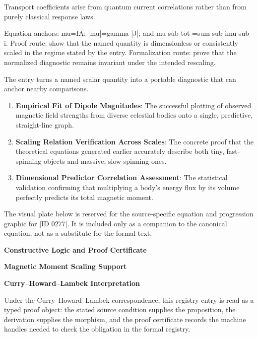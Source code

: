 Transport coefficients arise from quantum current correlations rather than from purely classical response laws.

Equation anchors: mu=IA; |mu|=gamma |J|; and mu sub tot =sum sub imu sub i. Proof route: show that the named quantity is dimensionless or consistently scaled in the regime stated by the entry. Formalization route: prove that the normalized diagnostic remains invariant under the intended rescaling.

The entry turns a named scalar quantity into a portable diagnostic that can anchor nearby comparisons.
\endgroup

\begin{enumerate}[leftmargin=1.6em,itemsep=6pt,topsep=4pt]
\item \textbf{Empirical Fit of Dipole Magnitudes}: The successful plotting of observed magnetic field strengths from diverse celestial bodies onto a single, predictive, straight-line graph.
\item \textbf{Scaling Relation Verification Across Scales}: The concrete proof that the theoretical equations generated earlier accurately describe both tiny, fast-spinning objects and massive, slow-spinning ones.
\item \textbf{Dimensional Predictor Correlation Assessment}: The statistical validation confirming that multiplying a body's energy flux by its volume perfectly predicts its total magnetic moment.
\end{enumerate}

\begingroup\footnotesize\sloppy
The visual plate below is reserved for the source-specific equation and progression graphic for [ID 0277]. It is included only as a companion to the canonical equation, not as a substitute for the formal text.
\par\endgroup
\ifTZPDarkEdition
{}
\fi

\clearpage
\begingroup\tzpsupportsetup
\noindent\textbf{\fontsize{10.8pt}{12.8pt}\selectfont [ID 0277] Constructive Logic and Proof Certificate}\par
\noindent\textbf{\fontsize{10pt}{12pt}\selectfont Magnetic Moment Scaling Support}\par
\vspace{0.45em}
\begingroup
\footnotesize
\setlength{\parskip}{0.22em}
\setlength{\parindent}{0pt}
\noindent\textbf{Curry--Howard--Lambek Interpretation}\par
Under the Curry--Howard--Lambek correspondence, this registry entry is read as a typed proof
object: the stated source condition supplies the proposition, the derivation supplies the
morphism, and the proof certificate records the machine handles needed to check the obligation
in the formal registry.

